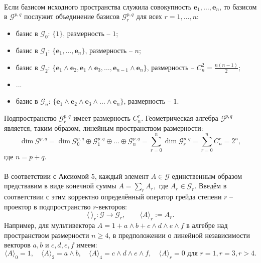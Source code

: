 \documentclass[12pt]{article}
\begin{document}
\paragraph{}
Если базисом исходного пространства служила совокупность $\mathbf{e}_1, \dots, \mathbf{e}_n$, то базисом в $\mathcal{G}^{p,q}$ послужит объединение базисов $\mathcal{G}^{p,q}_r$ для всех $r = 1, \dots, n$:
\begin{itemize}
    \item[]базис в $\mathcal{G}_0$: $\{1\}$, размерность -- $1$;
    \item[]базис в $\mathcal{G}_1$: $\{\mathbf{e}_1, \dots, \mathbf{e}_n\}$, размерность -- $n$;
    \item[]базис в $\mathcal{G}_2$: $\{\mathbf{e}_1 \wedge \mathbf{e}_2, \mathbf{e}_1 \wedge \mathbf{e}_3, \dots,\mathbf{e}_{n-1} \wedge \mathbf{e}_n\}$, размерность -- $C_n^2 = \frac{n(n-1)}{2}$;
    \item[]...
    \item[]базис в $\mathcal{G}_n$: $\{\mathbf{e}_1 \wedge \mathbf{e}_2 \wedge \mathbf{e}_3 \wedge \dots \wedge \mathbf{e}_n\}$, размерность -- $1$.
    
\end{itemize}
Подпространство $\mathcal{G}^{p,q}_r$ имеет размерность $C_n^r$. Геометрическая алгебра $\mathcal{G}^{p,q}$ является, таким образом, линейным пространством размерности: $$\dim \mathcal{G}^{p,q} = \dim \mathcal{G}^{p,q}_0 \oplus \mathcal{G}^{p,q}_1 \oplus \dots \oplus \mathcal{G}^{p,q}_n = \sum_{r=0}^n \dim \mathcal{G}^{p,q}_r  = \sum_{r=0}^n C_n^r =  2^n,$$
где $n = p + q$.

\paragraph{}
В соответствии с Аксиомой 5, каждый элемент $A \in \mathcal{G}$ единственным образом предствавим в виде конечной суммы $A = \sum_r A_r, \text{ где } A_r \in \mathcal{G}_r.$ Введём в соответствии с этим корректно определённый оператор грейда степени $r$ -- проектор в подпространство $r$-векторов: 
$$\langle \ \rangle_r:\mathcal{G} \rightarrow \mathcal{G}_r, \quad \quad  \langle A \rangle_r := A_r.$$
Например, для мультивектора $A = 1 + a \wedge b + c \wedge d \wedge e \wedge f$ в алгебре над пространством размерности $n \geq 4$, в предположении о линейной независимости векторов $a, b$ и $c, d, e, f$
имеем:
$$ \langle A \rangle_0 = 1, \quad \langle A \rangle_2 = a \wedge b, \quad \langle A \rangle_4 = c \wedge d \wedge e \wedge f, \quad \langle A \rangle_r = 0 \text{ для } r =1, r= 3, r > 4.$$
\end{document}

